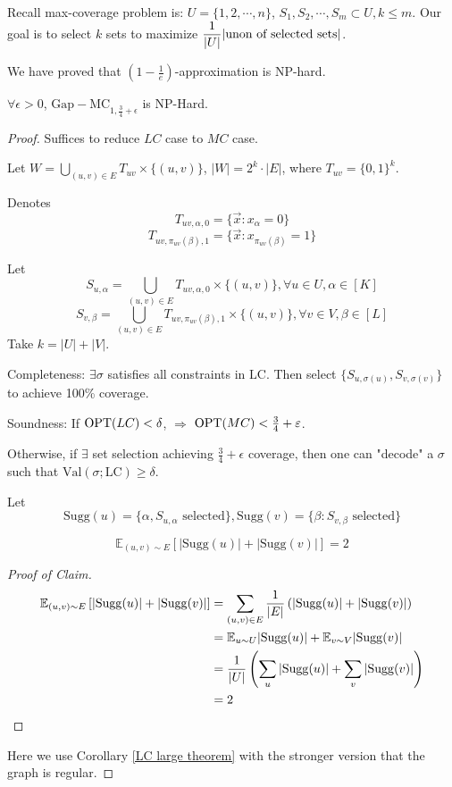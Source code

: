 
    Recall max-coverage problem is:  $ U=\{1,2,\cdots,n\} $,  $ S_1,S_2,\cdots,S_m\subset U,k \leq m $. Our goal is to select  $ k  $ sets to maximize  $ \displaystyle\frac{1}{|U|}|\text{unon of selected sets}| $.
    
    We have proved that  $ (1-\frac{1}{e}) $-approximation is NP-hard.
    
\begin{theorem}
    $ \forall \epsilon>0 $,  $ \mathrm{Gap-MC}_{1,\frac{3}{4}+\epsilon} $ is NP-Hard.
\end{theorem}
\begin{proof}
    Suffices to reduce  $ LC $ case to  $ MC $ case.
    
    Let  $ W=\bigcup_{(u,v)\in E}T_{uv}\times\{(u,v)\} $,  $ |W|=2^k\cdot|E| $, where  $ T_{uv}=\{0,1\}^k $.
    
    Denotes 
    \[T_{uv,\alpha,0}=\{\vec{x}:x_\alpha=0\}\]
    \[T_{uv,\pi_{uv}(\beta),1}=\{\vec{x}:x_{\pi_{uv}(\beta)}=1\}\]


    Let  \[S_{u,\alpha}=\bigcup_{(u,v)\in E} T_{uv,\alpha,0}\times\{(u,v)\},\forall u\in U,\alpha\in [K] \]
    \[S_{v,\beta}=\bigcup_{(u,v)\in E}T_{uv,\pi_{uv}(\beta),1}\times\{(u,v)\},\forall v\in V,\beta\in [L]\]
    Take  $ k=|U|+|V| $.

    Completeness: $ \exists\sigma $ satisfies all constraints in  $ \mathrm{LC} $. Then select  $ \{S_{u,\sigma(u)},S_{v,\sigma(v)}\} $ to achieve 100\% coverage.
    
    Soundness: If  $ \mathrm{OPT}(LC)<\delta $,  $ \Rightarrow $  $ \mathrm{OPT}(MC)<\frac{3}{4}+\varepsilon $.
    
    Otherwise, if  $ \exists $ set selection achieving  $ \frac{3}{4}+\epsilon $ coverage, then one can "decode" a  $ \sigma  $ such that   $ \mathrm{Val}(\sigma;\mathrm{LC}) \geq \delta $.

    Let 
    \[\mathrm{Sugg}(u)=\{\alpha,S_{u,\alpha}\text{ selected}\},\mathrm{Sugg}(v)=\{\beta:S_{v,\beta}\text{ selected}\}\]

    \begin{claim}
        \[\mathbb{E}_{(u,v)\sim E}\left[|\mathrm{Sugg}(u)|+|\mathrm{Sugg}(v)|\right]=2\]
    \end{claim}
    \begin{proof}[Proof of Claim]
        \begin{align*}
            \mathbb{E}_{(u,v)\sim E}\left[|\mathrm{Sugg}(u)|+|\mathrm{Sugg}(v)|\right] &= \sum_{(u,v)\in E}\frac{1}{|E|}\left(|\mathrm{Sugg}(u)|+|\mathrm{Sugg}(v)|\right)\\
            &= \mathbb E_{u\sim U}|\mathrm{Sugg}(u)|+\mathbb E_{v\sim V}|\mathrm{Sugg}(v)|\\
            &=\frac{1}{|U|}\left(\sum_u|\mathrm{Sugg}(u)|+\sum_v|\mathrm{Sugg}(v)|\right)\\
            &=2
        \end{align*}
    \end{proof}
    Here we use Corollary \ref{LC large theorem} with the stronger version that the graph is regular.


\end{proof}
